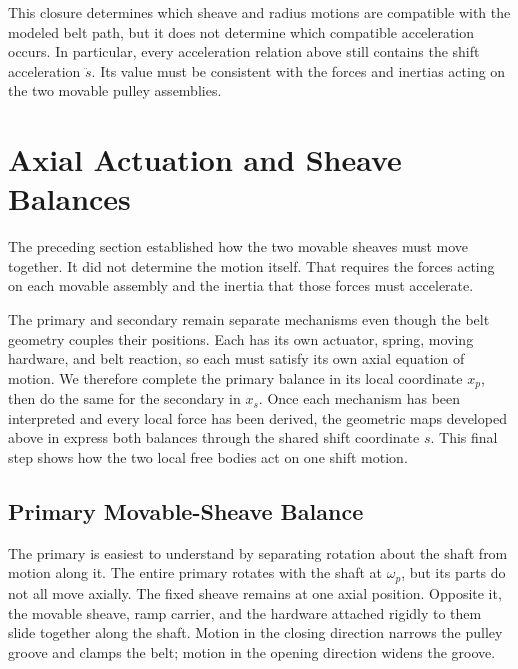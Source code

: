 \documentclass[11pt]{report}
\numberwithin{equation}{section}
\begin{document}
This closure determines which sheave and radius motions are compatible with
the modeled belt path, but it does not determine which compatible acceleration
occurs. In particular, every acceleration relation above still contains the
shift acceleration \(\ddot s\). Its value must be consistent with the forces
and inertias acting on the two movable pulley assemblies.



\section{Axial Actuation and Sheave Balances}
\label{sec:axial_actuation_balances}

The preceding section established how the two movable sheaves must move
together. It did not determine the motion itself. That requires the forces
acting on each movable assembly and the inertia that those forces must
accelerate.

The primary and secondary remain separate mechanisms even though the belt
geometry couples their positions. Each has its own actuator, spring, moving
hardware, and belt reaction, so each must satisfy its own axial equation of
motion. We therefore complete the primary balance in its local coordinate
\(x_p\), then do the same for the secondary in \(x_s\). Once each mechanism has
been interpreted and every local force has been derived, the geometric maps
developed above in  express both balances through the shared 
shift coordinate \(s\). This final step shows how the two local free bodies act 
on one shift motion.

\subsection{Primary Movable-Sheave Balance}
\label{sec:primary_movable_sheave_balance}

The primary is easiest to understand by separating rotation about the shaft
from motion along it. The entire primary rotates with the shaft at
\(\omega_p\), but its parts do not all move axially. The fixed sheave remains
at one axial position. Opposite it, the movable sheave, ramp carrier, and the
hardware attached rigidly to them slide together along the shaft. Motion in
the closing direction narrows the pulley groove and clamps the belt; motion in
the opening direction widens the groove.
\end{document}
